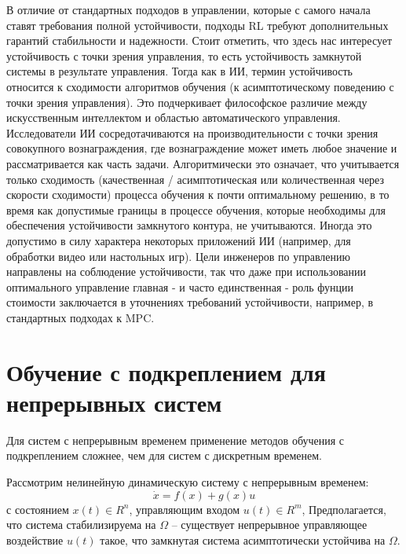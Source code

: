 В отличие от стандартных подходов в управлении, которые с самого начала ставят требования полной устойчивости, подходы RL требуют дополнительных гарантий стабильности и надежности. Стоит отметить, что здесь нас интересует устойчивость с точки зрения управления, то есть устойчивость замкнутой системы в результате управления. Тогда как в ИИ, термин устойчивость относится к сходимости алгоритмов обучения (к асимптотическому поведению с точки зрения управления). 
Это подчеркивает философское различие между искусственным интеллектом и областью автоматического управления. Исследователи ИИ сосредотачиваются на производительности с точки зрения совокупного вознаграждения, где вознаграждение может иметь любое значение и рассматривается как часть задачи. Алгоритмически это означает, что учитывается только сходимость (качественная / асимптотическая или количественная через скорости сходимости) процесса обучения к почти оптимальному решению, в то время как допустимые границы в процессе обучения, которые необходимы для обеспечения устойчивости замкнутого контура, не учитываются. Иногда это допустимо в силу характера некоторых приложений ИИ (например, для обработки видео или настольных игр). Цели инженеров по управлению направлены на соблюдение устойчивости, так что даже при использовании оптимального управление главная - и часто единственная - роль фунции стоимости заключается в уточнениях требований устойчивости, например, в стандартных подходах к MPC.



\section{Обучение с подкреплением для непрерывных систем}

Для систем с непрерывным временем применение методов обучения с подкреплением  сложнее, чем для систем с дискретным временем. 

Рассмотрим нелинейную динамическую систему с непрерывным временем:
\begin{equation*}
	\dot x = f(x) + g(x)u
\end{equation*}
с состоянием $x(t) \in R^n$, управляющим входом $u(t) \in R^m$,  Предполагается, что система стабилизируема на $\Omega$ -- существует непрерывное управляющее воздействие $u(t)$ такое, что замкнутая система асимптотически устойчива на $\Omega$.


